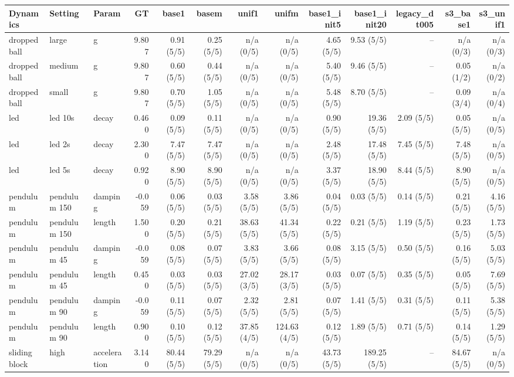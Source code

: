 \begin{tabular}{lll r r r r r r r r r r}
\toprule
Dynamics & Setting & Param & GT & base1 & basem & unif1 & unifm & base1_init5 & base1_init20 & legacy_dt005 & s3_base1 & s3_unif1 \\
\midrule
dropped ball & large & g & 9.807 & 0.91 (5/5) & 0.25 (5/5) & n/a (0/5) & n/a (0/5) & 4.65 (5/5) & 9.53 (5/5) & -- & n/a (0/3) & n/a (0/3) \\
dropped ball & medium & g & 9.807 & 0.60 (5/5) & 0.44 (5/5) & n/a (0/5) & n/a (0/5) & 5.40 (5/5) & 9.46 (5/5) & -- & 0.05 (1/2) & n/a (0/2) \\
dropped ball & small & g & 9.807 & 0.70 (5/5) & 1.05 (5/5) & n/a (0/5) & n/a (0/5) & 5.48 (5/5) & 8.70 (5/5) & -- & 0.09 (3/4) & n/a (0/4) \\
led & led 10s & decay & 0.460 & 0.09 (5/5) & 0.11 (5/5) & n/a (0/5) & n/a (0/5) & 0.90 (5/5) & 19.36 (5/5) & 2.09 (5/5) & 0.05 (5/5) & n/a (0/5) \\
led & led 2s & decay & 2.300 & 7.47 (5/5) & 7.47 (5/5) & n/a (0/5) & n/a (0/5) & 2.48 (5/5) & 17.48 (5/5) & 7.45 (5/5) & 7.48 (5/5) & n/a (0/5) \\
led & led 5s & decay & 0.920 & 8.90 (5/5) & 8.90 (5/5) & n/a (0/5) & n/a (0/5) & 3.37 (5/5) & 18.90 (5/5) & 8.44 (5/5) & 8.90 (5/5) & n/a (0/5) \\
pendulum & pendulum 150 & damping & -0.059 & 0.06 (5/5) & 0.03 (5/5) & 3.58 (5/5) & 3.86 (5/5) & 0.04 (5/5) & 0.03 (5/5) & 0.14 (5/5) & 0.21 (5/5) & 4.16 (5/5) \\
pendulum & pendulum 150 & length & 1.500 & 0.20 (5/5) & 0.21 (5/5) & 38.63 (5/5) & 41.34 (5/5) & 0.22 (5/5) & 0.21 (5/5) & 1.19 (5/5) & 0.23 (5/5) & 1.73 (5/5) \\
pendulum & pendulum 45 & damping & -0.059 & 0.08 (5/5) & 0.07 (5/5) & 3.83 (5/5) & 3.66 (5/5) & 0.08 (5/5) & 3.15 (5/5) & 0.50 (5/5) & 0.16 (5/5) & 5.03 (5/5) \\
pendulum & pendulum 45 & length & 0.450 & 0.03 (5/5) & 0.03 (5/5) & 27.02 (3/5) & 28.17 (3/5) & 0.03 (5/5) & 0.07 (5/5) & 0.35 (5/5) & 0.05 (5/5) & 7.69 (5/5) \\
pendulum & pendulum 90 & damping & -0.059 & 0.11 (5/5) & 0.07 (5/5) & 2.32 (5/5) & 2.81 (5/5) & 0.07 (5/5) & 1.41 (5/5) & 0.31 (5/5) & 0.11 (5/5) & 5.38 (5/5) \\
pendulum & pendulum 90 & length & 0.900 & 0.10 (5/5) & 0.12 (5/5) & 37.85 (4/5) & 124.63 (4/5) & 0.12 (5/5) & 1.89 (5/5) & 0.71 (5/5) & 0.14 (5/5) & 1.29 (5/5) \\
sliding block & high & acceleration & 3.140 & 80.44 (5/5) & 79.29 (5/5) & n/a (0/5) & n/a (0/5) & 43.73 (5/5) & 189.25 (5/5) & -- & 84.67 (5/5) & n/a (0/5) \\

\end{tabular}

